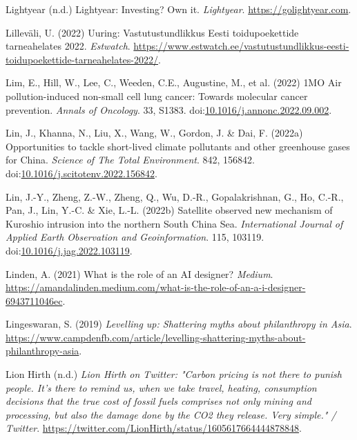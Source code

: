\documentclass[
  letterpaper,
  DIV=11,
  numbers=noendperiod]{scrartcl}
\newlength{\cslhangindent}
\newenvironment{CSLReferences}[2] %
 {\begin{list}{}{%
  \setlength{\itemindent}{0pt}
  \setlength{\leftmargin}{0pt}
  \setlength{\parsep}{0pt}
  \ifodd #1
   \setlength{\leftmargin}{\cslhangindent}
   \setlength{\itemindent}{-1\cslhangindent}
  \fi
  \setlength{\itemsep}{#2\baselineskip}}}
 {\end{list}}
\begin{document}
\begin{CSLReferences}{0}{1}
Lightyear (n.d.) Lightyear: {Investing}? {Own} it. \emph{Lightyear}.
\url{https://golightyear.com}.

Lilleväli, U. (2022) Uuring: {Vastutustundlikkus Eesti} toidupoekettide
tarneahelates 2022. \emph{Estwatch}.
\url{https://www.estwatch.ee/vastutustundlikkus-eesti-toidupoekettide-tarneahelates-2022/}.

Lim, E., Hill, W., Lee, C., Weeden, C.E., Augustine, M., et al. (2022)
{1MO Air} pollution-induced non-small cell lung cancer: {Towards}
molecular cancer prevention. \emph{Annals of Oncology}. 33, S1383.
doi:\href{https://doi.org/10.1016/j.annonc.2022.09.002}{10.1016/j.annonc.2022.09.002}.

Lin, J., Khanna, N., Liu, X., Wang, W., Gordon, J. \& Dai, F. (2022a)
Opportunities to tackle short-lived climate pollutants and other
greenhouse gases for {China}. \emph{Science of The Total Environment}.
842, 156842.
doi:\href{https://doi.org/10.1016/j.scitotenv.2022.156842}{10.1016/j.scitotenv.2022.156842}.

Lin, J.-Y., Zheng, Z.-W., Zheng, Q., Wu, D.-R., Gopalakrishnan, G., Ho,
C.-R., Pan, J., Lin, Y.-C. \& Xie, L.-L. (2022b) Satellite observed new
mechanism of {Kuroshio} intrusion into the northern {South China Sea}.
\emph{International Journal of Applied Earth Observation and
Geoinformation}. 115, 103119.
doi:\href{https://doi.org/10.1016/j.jag.2022.103119}{10.1016/j.jag.2022.103119}.

Linden, A. (2021) What is the role of an {AI} designer? \emph{Medium}.
\url{https://amandalinden.medium.com/what-is-the-role-of-an-a-i-designer-6943711046ec}.

Lingeswaran, S. (2019) \emph{Levelling up: {Shattering} myths about
philanthropy in {Asia}}.
\url{https://www.campdenfb.com/article/levelling-shattering-myths-about-philanthropy-asia}.

Lion Hirth (n.d.) \emph{Lion {Hirth} on {Twitter}: "{Carbon} pricing is
not there to punish people. {It}'s there to remind us, when we take
travel, heating, consumption decisions that the true cost of fossil
fuels comprises not only mining and processing, but also the damage done
by the {CO2} they release. {Very} simple." / {Twitter}}.
\url{https://twitter.com/LionHirth/status/1605617664444878848}.


\end{CSLReferences}
\end{document}
